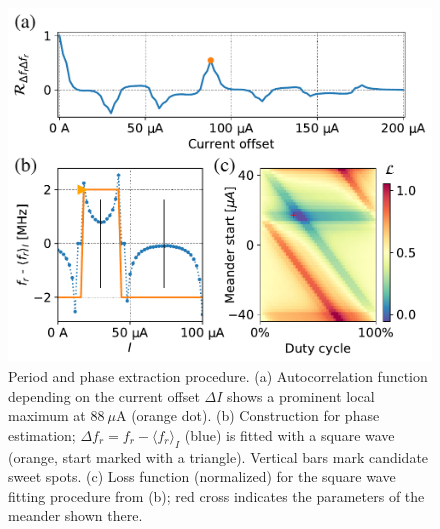 \documentclass[%
 aip,
 amsmath,amssymb,
 reprint,%
]{revtex4-1}
\begin{document}
\begin{figure}
	\centering
	\includegraphics[width=\linewidth]{per+phase}
	\caption{Period and phase extraction procedure. (a) Autocorrelation function depending on the current offset $\Delta I$ shows a prominent local maximum at $88\ \mu$A (orange dot). (b) Construction for phase estimation; $\Delta f_r = f_r-\langle f_r \rangle_{I}$ (blue) is fitted with a square wave (orange, start marked with a triangle). Vertical bars mark candidate sweet spots. (c) Loss function (normalized) for the square wave fitting procedure from (b); red cross indicates the parameters of the meander shown there.}
	\label{fig:per+phase}
\end{figure}
\end{document}
